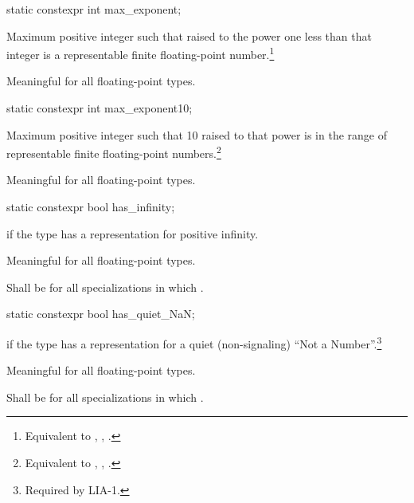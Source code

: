 %
\begin{itemdecl}
static constexpr int  max_exponent;
\end{itemdecl}

\begin{itemdescr}
\pnum
Maximum positive integer such that
raised to the power one less than that integer is a representable finite
floating-point number.\footnote{Equivalent to ,
, .}

\pnum
Meaningful for all floating-point types.
\end{itemdescr}

%
\begin{itemdecl}
static constexpr int  max_exponent10;
\end{itemdecl}

\begin{itemdescr}
\pnum
Maximum positive integer such that 10 raised to that power is in the
range of representable finite floating-point numbers.\footnote{Equivalent to
, , .}

\pnum
Meaningful for all floating-point types.
\end{itemdescr}

%
\begin{itemdecl}
static constexpr bool has_infinity;
\end{itemdecl}

\begin{itemdescr}
\pnum
{} if the type has a representation for positive infinity.

\pnum
Meaningful for all floating-point types.

\pnum
Shall be
for all specializations in which
.
\end{itemdescr}

%
\begin{itemdecl}
static constexpr bool has_quiet_NaN;
\end{itemdecl}

\begin{itemdescr}
\pnum
{} if the type has a representation for a quiet (non-signaling) ``Not a
Number''.\footnote{Required by LIA-1.}

\pnum
Meaningful for all floating-point types.

\pnum
Shall be
for all specializations in which
.
\end{itemdescr}

